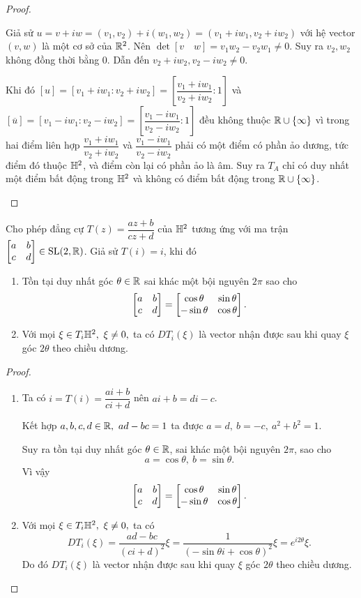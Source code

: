 \begin{proof}
\begin{enumerate}
        Giả sử $u = v + iw = (v_1,v_2) + i(w_1,w_2) = (v_1+iw_1,v_2+iw_2)$ với hệ vector $(v,w)$ là một cơ sở của $\mathbb{R}^2$. Nên $\det[v \quad w] = v_1w_2 - v_2w_1 \neq 0$. Suy ra $v_2, w_2$ không đồng thời bằng 0. Dẫn đến $v_2+iw_2, v_2-iw_2 \neq 0$.
        
        Khi đó $[u] = [v_1+iw_1:v_2+iw_2] = \left[\dfrac{v_1+iw_1}{v_2+iw_2}:1\right]$ và $[\overline{u}] = [v_1-iw_1:v_2-iw_2] = \left[\dfrac{v_1-iw_1}{v_2-iw_2}:1\right]$ đều không thuộc $\mathbb{R} \cup \{\infty\}$
        vì trong hai điểm liên hợp $\dfrac{v_1+iw_1}{v_2+iw_2}$ và $ \dfrac{v_1-iw_1}{v_2-iw_2}$ phải có một điểm có phần ảo dương, tức điểm đó thuộc $\mathbb{H}^2$, và điểm còn lại có phần ảo là âm. Suy ra $T_A$ chỉ có duy nhất một điểm bất động trong $\mathbb{H}^2$ và không có điểm bất động trong $\mathbb{R} \cup \{\infty\}$.
        
    \end{enumerate}
\end{proof}
\begin{prop}\label{prop 3.1.10}
    Cho phép đẳng cự $T(z) = \dfrac{az+b}{cz+d}$ của $\mathbb{H}^2$ tương ứng với ma trận $\begin{bmatrix} a & b \\ c & d \\ \end{bmatrix} \in \operatorname{SL}(2,\mathbb{R})$. Giả sử $T(i) = i$, khi đó
    \begin{enumerate}
        \item Tồn tại duy nhất góc $\theta \in \mathbb{R}$ sai khác một bội nguyên $2\pi$ sao cho \[\begin{bmatrix} a & b \\ c & d \\ \end{bmatrix} = \begin{bmatrix} \cos{\theta} & \sin{\theta}\\ -\sin{\theta} & \cos{\theta} \end{bmatrix}.\]
        \item Với mọi $\xi \in T_i\mathbb{H}^2,~\xi \neq 0,$ ta có $DT_i(\xi)$  là vector nhận được sau khi quay $\xi$ góc $2\theta$ theo chiều dương. 
    \end{enumerate}
\end{prop}
\begin{proof}
    \begin{enumerate}
        \item 
    Ta có $i = T(i) = \dfrac{ai+b}{ci+d}$ nên $ai+b = di -c$. 
    
    Kết hợp $a,b,c,d \in \mathbb{R},~ad-bc = 1$ ta được $a = d,~ b = -c,~a^ 2 + b^2 = 1$. 
    
    Suy ra tồn tại duy nhất góc $\theta \in \mathbb{R}$, sai khác một bội nguyên $2\pi$, sao cho 
    \[a = \cos{\theta},~b = \sin{\theta}.\]
    Vì vậy \[\begin{bmatrix} a & b \\ c & d \\ \end{bmatrix} = \begin{bmatrix} \cos{\theta} & \sin{\theta}\\ -\sin{\theta} & \cos{\theta} \end{bmatrix}.\]
    \item Với mọi $\xi \in T_i\mathbb{H}^2,~\xi \neq 0,$ ta có 
    \[DT_i(\xi) = \dfrac{ad-bc}{(ci+d)^2}\xi = \dfrac{1}{(-\sin{\theta}i+ \cos{\theta})^2}\xi = e^{i 2\theta}\xi.\]
    Do đó $DT_i(\xi)$  là vector nhận được sau khi quay $\xi$ góc $2\theta$ theo chiều dương. 
    \end{enumerate}
\end{proof}

